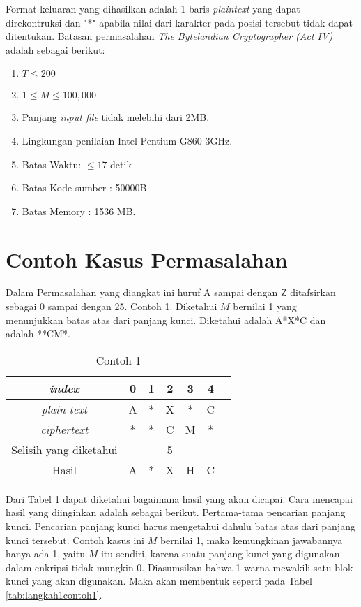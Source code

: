 	
	Format keluaran yang dihasilkan adalah 1 baris \textit{plaintext} yang dapat direkontruksi dan "*" apabila nilai dari karakter pada posisi tersebut tidak dapat ditentukan. 
	Batasan permasalahan \textit{The Bytelandian Cryptographer (Act IV)} adalah sebagai berikut:
	\begin{enumerate}
		\item $T \leq 200$
		\item $1 \leq M \leq 100,000$
		\item Panjang \textit{input file} tidak melebihi dari 2MB.
		\item Lingkungan penilaian Intel Pentium G860 3GHz.
		\item Batas Waktu: $\leq17$ detik
		\item Batas Kode sumber : 50000B
		\item Batas Memory : 1536 MB.                 
	\end{enumerate}

	\section{Contoh Kasus Permasalahan}
	Dalam Permasalahan yang diangkat ini huruf A sampai dengan Z ditafsirkan sebagai 0 sampai dengan 25.
	Contoh 1. Diketahui $M$ bernilai 1 yang menunjukkan batas atas dari panjang kunci. Diketahui \plaintext adalah A*X*C dan \ciphertext adalah **CM*. 
	\begin{table}[H]
	 	\centering
		\caption{Contoh 1}	 	
	 	\begin{tabular}{|c|c|c|c|c|c|c|}\hline
	 	\textit{index}&0&1&2&3&4\\ \hline
	 	\textit{plain text}&A&*&X&*&C\\ \hline
	 	\textit{ciphertext}&*&*&C&M&*\\ \hline
	 	Selisih yang diketahui& & &5& & \\ \hline
	 	Hasil              &A&*&X&H&C\\ \hline
	 	\end{tabular}
	 	\label{tab:contoh1}
	\end{table}
	 
	 Dari Tabel \ref{tab:contoh1} dapat diketahui bagaimana hasil yang akan dicapai. Cara mencapai hasil yang diinginkan adalah sebagai berikut. Pertama-tama pencarian panjang kunci. Pencarian panjang kunci harus mengetahui dahulu batas atas dari panjang kunci tersebut. Contoh kasus ini $M$ bernilai 1, maka kemungkinan jawabannya hanya ada 1, yaitu $M$ itu sendiri, karena suatu panjang kunci yang digunakan dalam enkripsi tidak mungkin 0. Diasumsikan bahwa 1 warna mewakili satu blok kunci yang akan digunakan. Maka akan membentuk seperti pada Tabel \ref{tab:langkah1contoh1}.
	 
